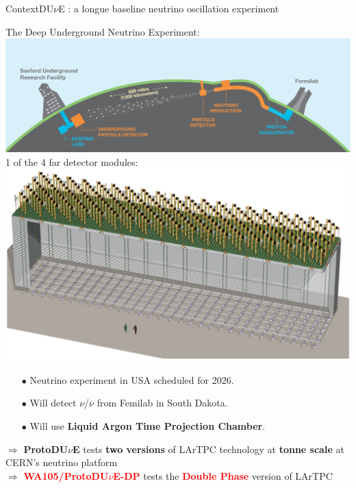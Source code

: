 \documentclass[10pt]{beamer}
\begin{document}
    \begin{frame}{Context}{DU$\nu$E : a longue baseline neutrino oscillation experiment}
    	\begin{scriptsize}
    	\begin{minipage}{0.58\textwidth}
    		The Deep Underground Neutrino Experiment:\\
    		\includegraphics[width=\textwidth]{figures/contexte/dune.jpg}\\
    		
    		1 of the 4 far detector modules:\\
    		\includegraphics[width=\textwidth]{figures/contexte/dune_module.png}\\
    	\end{minipage}
    	\hfill
    	\begin{minipage}{0.38\textwidth}
    		\begin{itemize}
    			\item[$\bullet$] Neutrino experiment in USA scheduled for 2026.
    			\item[$\bullet$] Will detect $\nu$/$\overline{\nu}$ from Femilab in South Dakota.
    			\item[$\bullet$] Will use \textbf{Liquid Argon Time Projection Chamber}.
    		\end{itemize}
    		\vspace{.3cm}
    		$\Rightarrow$ \textbf{ProtoDU$\nu$E} tests \textbf{two versions} of LArTPC technology at \textbf{tonne scale} at CERN's neutrino platform\\
    		
    		$\Rightarrow$ \textcolor{red}{\textbf{WA105/ProtoDU$\nu$E-DP}} tests the \textcolor{red}{\textbf{Double Phase}} version of LArTPC 
	    \end{minipage}
	\end{scriptsize}
    \end{frame}
    
\end{document}
